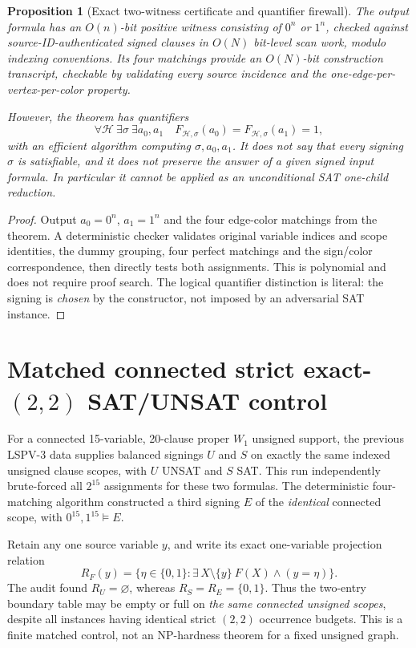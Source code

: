 \documentclass[11pt]{article}
\newtheorem{proposition}[theorem]{Proposition}
\begin{document}
\begin{proposition}[Exact two-witness certificate and quantifier firewall]\label{prop:firewall}
The output formula has an $O(n)$-bit positive witness consisting of $0^n$ or $1^n$, checked against source-ID-authenticated signed clauses in $O(N)$ bit-level scan work, modulo indexing conventions. Its four matchings provide an $O(N)$-bit construction transcript, checkable by validating every source incidence and the one-edge-per-vertex-per-color property.

However, the theorem has quantifiers
\[
 \forall\mathcal H\ \exists\sigma\ \exists a_0,a_1\quad
 F_{\mathcal H,\sigma}(a_0)=F_{\mathcal H,\sigma}(a_1)=1,
\]
with an efficient algorithm computing $\sigma,a_0,a_1$. It does \emph{not} say that \emph{every} signing $\sigma$ is satisfiable, and it does not preserve the answer of a \emph{given signed} input formula. In particular it cannot be applied as an unconditional SAT one-child reduction.
\end{proposition}
\begin{proof}
Output $a_0=0^n$, $a_1=1^n$ and the four edge-color matchings from the theorem. A deterministic checker validates original variable indices and scope identities, the dummy grouping, four perfect matchings and the sign/color correspondence, then directly tests both assignments. This is polynomial and does not require proof search. The logical quantifier distinction is literal: the signing is \emph{chosen} by the constructor, not imposed by an adversarial SAT instance.\end{proof}

\section{Matched connected strict exact-$(2,2)$ SAT/UNSAT control}
For a connected 15-variable, 20-clause proper $W_1$ unsigned support, the previous LSPV-3 data supplies balanced signings $U$ and $S$ on exactly the same indexed unsigned clause scopes, with $U$ UNSAT and $S$ SAT. This run independently brute-forced all $2^{15}$ assignments for these two formulas. The deterministic four-matching algorithm constructed a third signing $E$ of the \emph{identical} connected scope, with $0^{15},1^{15}\models E$.

Retain any one source variable $y$, and write its exact one-variable projection relation
\[
 R_F(y)=\{\eta\in\{0,1\}:\exists\,X\setminus\{y\}\ F(X)\wedge(y=\eta)\}.
\]
The audit found $R_U=\varnothing$, whereas $R_S=R_E=\{0,1\}$. Thus the two-entry boundary table may be empty or full on \emph{the same connected unsigned scopes}, despite all instances having identical strict $(2,2)$ occurrence budgets. This is a finite matched control, not an NP-hardness theorem for a fixed unsigned graph.
\end{document}
